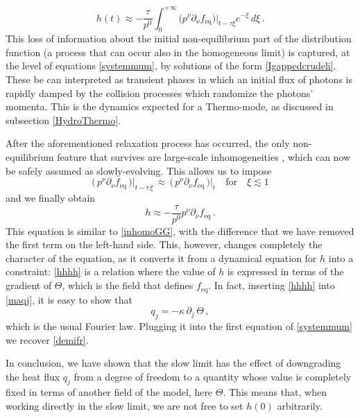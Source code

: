\documentclass[a4paper, amsfonts, amssymb, amsmath, reprint, twocolumn, showkeys, nofootinbib]{revtex4-2}
\begin{document}
\begin{equation}\label{hoftitty2}
h(t) \approx - \dfrac{\tau}{p^0} \int_0^{+\infty} \bigg( p^\nu \partial_\nu f_{\text{eq}} \bigg)\bigg|_{t-\tau \xi} e^{-\xi} \, d\xi \, .
\end{equation}
This loss of information about the initial non-equilibrium part of the distribution function (a process that can occur also in the homogeneous limit) is captured, at the level of equations \eqref{systemmum}, by solutions of the form \eqref{Igappedcrudeli}. These be can interpreted as transient phases in which an initial flux of photons is rapidly damped by the collision processes which randomize the photons' momenta. This is the dynamics expected for a Thermo-mode, as discussed in subsection \ref{HydroThermo}.

After the aforementioned relaxation process has occurred, the only non-equilibrium feature that survives are large-scale inhomogeneities  \cite{Glorioso2018}, which can now be safely assumed as slowly-evolving. This allows us to impose
\begin{equation}
\big( \, p^\nu \partial_\nu f_{\text{eq}} \, \big)\big|_{t-\tau \, \xi} 
\, \approx  \, 
\big( \, p^\nu \partial_\nu f_{\text{eq}} \, \big)\big|_{t}  
\quad  \text{for} \quad  \xi \lesssim 1
\end{equation}
and we finally obtain
\begin{equation}\label{hhhh}
h \approx - \dfrac{\tau}{p^0}  p^\nu \partial_\nu f_{\text{eq}} \, .
\end{equation}
This equation is similar to \eqref{inhomoGG}, with the difference that we have removed the first term on the left-hand side. This, however, changes completely the character of the equation, as it converts it from a dynamical equation for $h$ into a constraint: \eqref{hhhh} is a relation where the value of $h$ is expressed in terms of the gradient of $\Theta$, which is the field that defines $f_{\text{eq}}$. 
In fact, inserting \eqref{hhhh} into \eqref{maqj}, it is easy to show that
\begin{equation}\label{FFouRRieRRzxub}
q_j = -\kappa \, \partial_j \, \Theta \, ,
\end{equation}  
which is the usual Fourier law. Plugging it into the first equation of \eqref{systemmum} we recover \eqref{demifr}.

In conclusion, we have shown that the slow limit has the effect of downgrading the heat flux $q_j$ from a degree of freedom to a quantity whose value is completely fixed in terms of another field of the model, here $\Theta$. 
This means that, when working  directly in the slow limit, we are not free to set $h(0)$ arbitrarily. 
\end{document}
